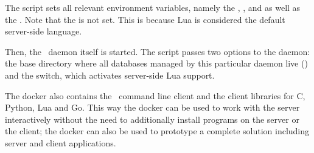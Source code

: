 
The script sets all relevant environment variables,
namely the ,
,
 and 
as well as the .
Note that the  is not set.
This is because Lua is considered the
default server-side language.

Then, the \nowdb\ daemon itself is started.
The script passes two options to the daemon:
the base directory where all databases
managed by this particular daemon live ()
and the  switch, which activates
server-side Lua support.

The docker also contains the \nowdb\ command line client
and the client libraries for C, Python, Lua and Go.
This way the docker can be used to work with the server
interactively without the need to additionally install
programs on the server or the client; the docker can
also be used to prototype a complete solution including
server and client applications.
